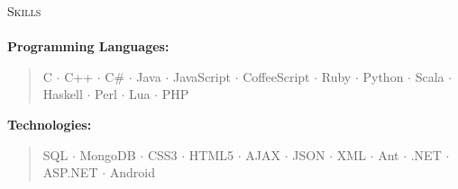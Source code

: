 \documentclass{article}
\newcommand{\skill}[2]{\textbf{#1:}  \begin{verse}#2\end{verse} }
\newcommand{\lineunder}{\vspace*{-8pt} \\ \hspace*{-18pt} \hrulefill \\}
\newcommand{\header}[1]{{\hspace*{-15pt}\vspace*{6pt} \textsc{#1}} \vspace*{-6pt} \lineunder}
\begin{document}
\header{Skills}
    \skill{Programming Languages}{C $\cdot$ C++ $\cdot$ C\# $\cdot$ Java $\cdot$ JavaScript $\cdot$ CoffeeScript  
        $\cdot$ Ruby $\cdot$ Python $\cdot$ Scala $\cdot$ Haskell $\cdot$ Perl $\cdot$ Lua $\cdot$ PHP}
    \skill{Technologies}{SQL $\cdot$ MongoDB $\cdot$ CSS3 $\cdot$ HTML5 $\cdot$ AJAX $\cdot$ JSON
        $\cdot$ XML $\cdot$ Ant $\cdot$ .NET $\cdot$ ASP.NET $\cdot$ Android}
\end{document}
